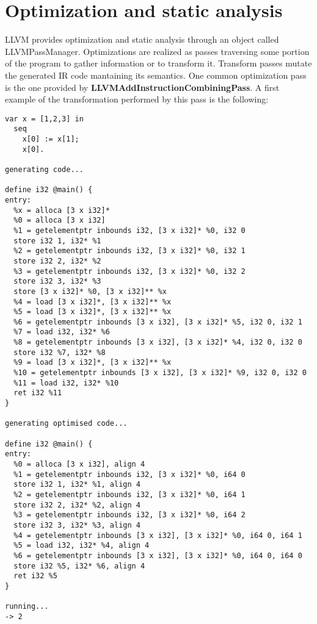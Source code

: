 \documentclass[11pt]{article}
\begin{document}
\section{Optimization and static analysis}
LLVM provides optimization and static analysis through an object called LLVMPassManager. Optimizations are realized as passes traversing some portion of the program to gather information or to transform it. Transform passes mutate the generated IR code mantaining its semantics.
One common optimization pass is the one provided by \textbf{LLVMAddInstructionCombiningPass}. A first example of the transformation performed by this pass is the following:
\begin{verbatim}
var x = [1,2,3] in
  seq
    x[0] := x[1];
    x[0].

generating code...

define i32 @main() {
entry:
  %x = alloca [3 x i32]*
  %0 = alloca [3 x i32]
  %1 = getelementptr inbounds i32, [3 x i32]* %0, i32 0
  store i32 1, i32* %1
  %2 = getelementptr inbounds i32, [3 x i32]* %0, i32 1
  store i32 2, i32* %2
  %3 = getelementptr inbounds i32, [3 x i32]* %0, i32 2
  store i32 3, i32* %3
  store [3 x i32]* %0, [3 x i32]** %x
  %4 = load [3 x i32]*, [3 x i32]** %x
  %5 = load [3 x i32]*, [3 x i32]** %x
  %6 = getelementptr inbounds [3 x i32], [3 x i32]* %5, i32 0, i32 1
  %7 = load i32, i32* %6
  %8 = getelementptr inbounds [3 x i32], [3 x i32]* %4, i32 0, i32 0
  store i32 %7, i32* %8
  %9 = load [3 x i32]*, [3 x i32]** %x
  %10 = getelementptr inbounds [3 x i32], [3 x i32]* %9, i32 0, i32 0
  %11 = load i32, i32* %10
  ret i32 %11
}

generating optimised code...

define i32 @main() {
entry:
  %0 = alloca [3 x i32], align 4
  %1 = getelementptr inbounds i32, [3 x i32]* %0, i64 0
  store i32 1, i32* %1, align 4
  %2 = getelementptr inbounds i32, [3 x i32]* %0, i64 1
  store i32 2, i32* %2, align 4
  %3 = getelementptr inbounds i32, [3 x i32]* %0, i64 2
  store i32 3, i32* %3, align 4
  %4 = getelementptr inbounds [3 x i32], [3 x i32]* %0, i64 0, i64 1
  %5 = load i32, i32* %4, align 4
  %6 = getelementptr inbounds [3 x i32], [3 x i32]* %0, i64 0, i64 0
  store i32 %5, i32* %6, align 4
  ret i32 %5
}

running...
-> 2    
\end{verbatim}
\end{document}
